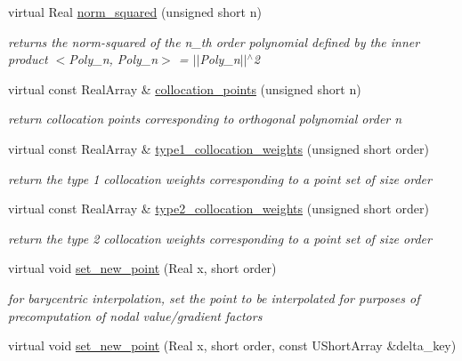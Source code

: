\begin{DoxyCompactItemize}
virtual Real \hyperlink{classPecos_1_1BasisPolynomial_ab74383be309d74823f2e5e85dad739b2}{norm\+\_\+squared} (unsigned short n)
\begin{DoxyCompactList}\small\item\em returns the norm-\/squared of the n\+\_\+th order polynomial defined by the inner product $<$Poly\+\_\+n, Poly\+\_\+n$>$ = $\vert$$\vert$\+Poly\+\_\+n$\vert$$\vert$$^\wedge$2 \end{DoxyCompactList}\item 
virtual const Real\+Array \& \hyperlink{classPecos_1_1BasisPolynomial_a0f96bd4e27ddc5c44117e7b68744b5a4}{collocation\+\_\+points} (unsigned short n)
\begin{DoxyCompactList}\small\item\em return collocation points corresponding to orthogonal polynomial order n \end{DoxyCompactList}\item 
virtual const Real\+Array \& \hyperlink{classPecos_1_1BasisPolynomial_aa010321cf47465dca5725fa15ba58bf6}{type1\+\_\+collocation\+\_\+weights} (unsigned short order)
\begin{DoxyCompactList}\small\item\em return the type 1 collocation weights corresponding to a point set of size order \end{DoxyCompactList}\item 
virtual const Real\+Array \& \hyperlink{classPecos_1_1BasisPolynomial_a8bc6cc516ab2bccbbdca6e904dc5a10f}{type2\+\_\+collocation\+\_\+weights} (unsigned short order)
\begin{DoxyCompactList}\small\item\em return the type 2 collocation weights corresponding to a point set of size order \end{DoxyCompactList}\item 
virtual void \hyperlink{classPecos_1_1BasisPolynomial_afdf46109d433281e37d3de26f4bd1b3d}{set\+\_\+new\+\_\+point} (Real x, short order)\label{classPecos_1_1BasisPolynomial_afdf46109d433281e37d3de26f4bd1b3d}

\begin{DoxyCompactList}\small\item\em for barycentric interpolation, set the point to be interpolated for purposes of precomputation of nodal value/gradient factors \end{DoxyCompactList}\item 
virtual void \hyperlink{classPecos_1_1BasisPolynomial_a01ad737aacfeb1918ffae9b52323336a}{set\+\_\+new\+\_\+point} (Real x, short order, const U\+Short\+Array \&delta\+\_\+key)\label{classPecos_1_1BasisPolynomial_a01ad737aacfeb1918ffae9b52323336a}


\end{DoxyCompactItemize}
